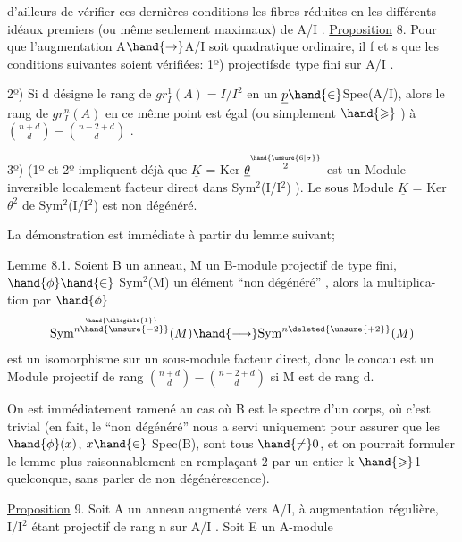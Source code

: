 \margin{\unsure{$\diagup$}}
d'ailleurs de vérifier ces dernières conditions  les fibres réduites
en les différents idéaux premiers (ou même seulement maximaux) de A/I .
\uline{Proposition} 8. Pour que l'augmentation A$\hand{\rightarrow}$A/I soit  quadratique
ordinaire, il f et s que les conditions suivantes soient vérifiées:
1º)   projectifsde type fini sur A/I .

2º) Si d désigne le rang de $gr^{1}_{I}(A) = I/I^{2}$ en un $\underline{p} \hand{\in}$Spec(A/I),
alors le rang de $gr^{n}_{I}(A)$ en ce même point est égal (ou simplement
$\hand{\geqslant}$ ) à $\binom{n+d}{d} - \binom{n-2+d}{d}$ .

3º) (1º et 2º impliquent déjà que $\underline{K}$ = Ker $\underline{\theta}^{\overset{\hand{\unsure{6|\sigma}}}{2}}$ est un Module
inversible localement facteur direct dans  Sym$^{2}$(I/I$^{2}$) ). Le sous
Module $\underline{K}$ = Ker $\theta^{2}$ de Sym$^{2}$(I/I$^{2}$) est non dégénéré.

La démonstration est immédiate à partir du lemme suivant; 

 \uline{Lemme} 8.1. Soient B un anneau, M un B-module projectif de
type fini, $\hand{\phi} \hand{\in}$ Sym$^{2}$(M) un élément ``non dégénéré'' , alors la multiplica-%
tion par $\hand{\phi}$
\[ \mathrm{Sym}^{\overset{\hand{\illegible{1}}}{n\hand{\unsure{-2}}}}(M) \hand{\longrightarrow} \mathrm{Sym}^{n\deleted{\unsure{+2}}}(M) \]
est un isomorphisme sur un sous-module facteur direct, donc le conoau
est un Module projectif de rang $\binom{n+d}{d} - \binom{n-2+d}{d}$ si M est de rang d.

On est immédiatement ramené au cas où B est le spectre d'un corps,
où c'est trivial (en fait, le ``non dégénéré'' nous a servi uniquement
\margin{||} pour assurer que les $\hand{\phi}(x)$, $x \hand{\in}$ Spec(B), sont tous $\hand{\neq} 0$, et on pourrait
formuler le lemme plus raisonnablement en remplaçant 2 par un entier
k $\hand{\geqslant}$1 quelconque, sans parler de non dégénérescence).

\uline{Proposition} 9. Soit A un anneau augmenté vers A/I, à augmentation
régulière, I/I$^{2}$ étant projectif de rang n sur A/I . Soit E un A-module


